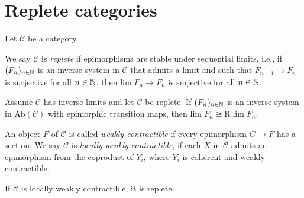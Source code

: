 \chapter{Replete categories}

Let $\mathcal{C}$ be a category.

\begin{definition}
    We say $\mathcal{C}$ is \emph{replete} if epimorphisms are stable under sequential limits, i.e.,
    if $(F_n)_{n \in \mathbb{N}}$ is an inverse system in $\mathcal{C}$ that admits a limit and such that
    $F_{n+1} \to F_n$ is surjective for all $n \in \mathbb{N}$, then $\mathrm{lim}\; F_n \to F_n$ is
    surjective for all $n \in \mathbb{N}$.
    \label{def:replete}
\end{definition}

\begin{proposition}
    Assume $\mathcal{C}$ has inverse limits and let $\mathcal{C}$ be replete.
    If $(F_n)_{n \in \mathbb{N}}$ is an inverse system in $\mathrm{Ab}(\mathcal{C})$ with
    epimorphic transition maps, then $\mathrm{lim} \; F_n \cong \mathrm{R}\; \mathrm{lim} \; F_n$.
    \label{prop:lim-exact-replete}
\end{proposition}

\begin{definition}
    An object $F$ of $\mathcal{C}$ is called \emph{weakly contractible} if every epimorphism
    $G \to F$ has a section. We say $\mathcal{C}$ is \emph{locally weakly contractible},
    if each $X$ in $\mathcal{C}$ admits an epimorphism from the coproduct of $Y_i$,
    where $Y_i$ is coherent and weakly contractible.
    \label{def:lwc}
\end{definition}

\begin{proposition}
    If $\mathcal{C}$ is locally weakly contractible, it is replete.
    \label{prop:lwc-replete}
\end{proposition}
